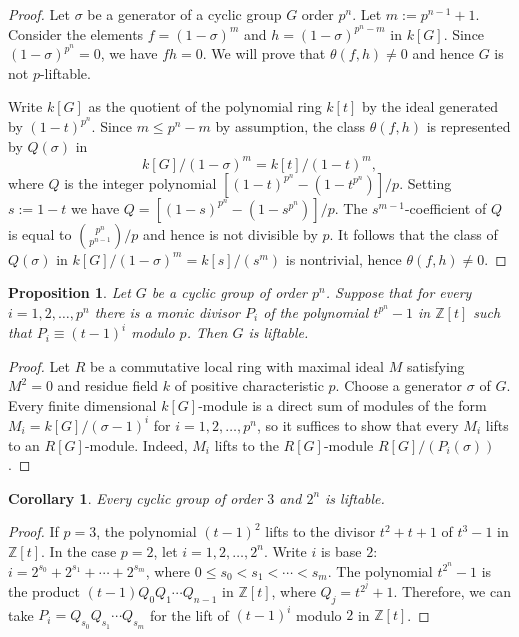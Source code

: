 \documentclass[12pt]{amsart}
\numberwithin{equation}{section}
\newtheorem{proposition}[equation]{Proposition}
\newtheorem{corollary}[equation]{Corollary}
\theoremstyle{definition}
\renewcommand{\(}{\bigl(}
\renewcommand{\)}{\bigr)}
\newcommand{\Z}{\mathbb{Z}}
\renewcommand{\leq}{\leqslant}
\begin{document}
\begin{proof}
Let $\sigma$ be a generator of a cyclic group $G$ order $p^n$. Let $m:=p^{n-1}+1$. Consider the elements $f=(1-\sigma)^m$
and $h=(1-\sigma)^{p^n-m}$ in $k[G]$. Since $(1-\sigma)^{p^n}=0$, we have $fh=0$. We will prove that  $\theta(f,h)\neq 0$
and hence $G$ is not $p$-liftable.

Write $k[G]$ as the quotient of the polynomial ring $k[t]$ by the ideal generated by $(1-t)^{p^n}$. Since $m\leq p^n-m$ by
assumption, the class $\theta(f,h)$ is represented by $Q(\sigma)$ in
\[
k[G]/(1-\sigma)^m=k[t]/(1-t)^m,
\]
where $Q$ is the integer polynomial $[(1-t)^{p^n} -(1-t^{p^n})]/{p}$.
Setting $s:=1-t$ we have $Q=[(1-s)^{p^n} -(1-s^{p^n})]/{p}$.
The $s^{m-1}$-coefficient of $Q$ is equal to $\binom{p^n}{p^{n-1}}/p$ and hence is not divisible by $p$.
It follows that the class of $Q(\sigma)$ in $k[G]/(1-\sigma)^m=k[s]/(s^m)$ is nontrivial, hence $\theta(f,h)\neq 0$.
\end{proof}

\begin{proposition}\label{cyclic}
Let $G$ be a cyclic group of order $p^n$. Suppose that for every $i=1,2,\ldots, p^n$ there is a monic divisor $P_i$ of the
polynomial $t^{p^n}-1$ in $\Z[t]$ such that $P_i\equiv (t-1)^i$ modulo $p$. Then $G$ is liftable.
\end{proposition}

\begin{proof}
Let $R$ be a commutative local ring with maximal ideal $M$ satisfying $M^2=0$ and residue field $k$ of positive characteristic $p$.
 Choose a generator $\sigma$ of $G$.
Every finite dimensional $k[G]$-module is a direct sum of modules of the form $M_i=k[G]/(\sigma-1)^i$ for
$i=1,2,\ldots, p^n$, so it suffices to show that every $M_i$ lifts to an $R[G]$-module. Indeed,  $M_i$ lifts to the $R[G]$-module
$R[G]/(P_i(\sigma))$.
\end{proof}

\begin{corollary}\label{cycle2}\cite[Propositions 2.6 and 2.7]{KL}
Every cyclic group of order $3$ and $2^n$ is liftable.
\end{corollary}
\begin{proof}
If $p=3$, the polynomial $(t-1)^2$ lifts to the divisor $t^2+t+1$ of $t^3-1$ in $\Z[t]$.
In the case $p=2$, let $i=1,2,\ldots, 2^n$. Write $i$ is base $2$:
$i=2^{s_0}+2^{s_1}+\cdots +2^{s_m}$, where $0\leq s_0<s_1<\cdots <s_m$. The polynomial $t^{2^n}-1$ is the product
$(t-1)Q_0 Q_1\cdots Q_{n-1}$ in $\Z[t]$, where $Q_j=t^{2^j}+1$. Therefore, we can take
$P_i=Q_{s_0}Q_{s_1}\cdots Q_{s_m}$ for the lift of $(t-1)^i$ modulo $2$ in $\Z[t]$.
\end{proof}
\end{document}
